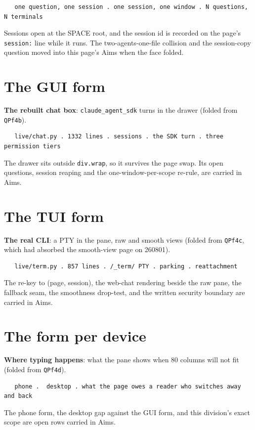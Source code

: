 \begin{verbatim}
   one question, one session . one session, one window . N questions, N terminals
\end{verbatim}
Sessions open at the SPACE root, and the session id is recorded on the page's \texttt{session:} line while it runs. The two-agents-one-file collision and the session-copy question moved into this page's Aims when the face folded.


\section{The GUI form}
\textbf{The rebuilt chat box}: \texttt{claude\_agent\_sdk} turns in the drawer (folded from \texttt{QPf4b}).

\begin{verbatim}
   live/chat.py . 1332 lines . sessions . the SDK turn . three permission tiers
\end{verbatim}
The drawer sits outside \texttt{div.wrap}, so it survives the page swap. Its open questions, session reaping and the one-window-per-scope re-rule, are carried in Aims.


\section{The TUI form}
\textbf{The real CLI}: a PTY in the pane, raw and smooth views (folded from \texttt{QPf4c}, which had absorbed the smooth-view page on 260801).

\begin{verbatim}
   live/term.py . 857 lines . /_term/ PTY . parking . reattachment
\end{verbatim}
The re-key to (page, session), the web-chat rendering beside the raw pane, the fallback seam, the smoothness drop-test, and the written security boundary are carried in Aims.


\section{The form per device}
\textbf{Where typing happens}: what the pane shows when 80 columns will not fit (folded from \texttt{QPf4d}).

\begin{verbatim}
   phone .  desktop . what the page owes a reader who switches away and back
\end{verbatim}
The phone form, the desktop gap against the GUI form, and this division's exact scope are open rows carried in Aims.

